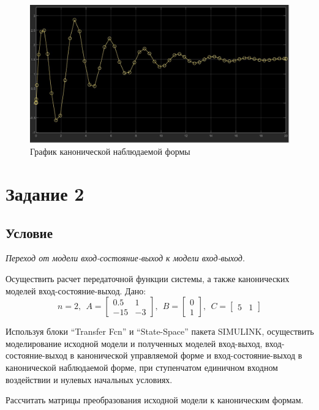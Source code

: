 \documentclass[a4paper, 12pt]{article}
\begin{document}
    \begin{figure}[H]
        \centering
        \includegraphics[scale=0.3]{canonical_observable_form_1.jpg}
        \captionsetup{skip=0pt}
        \caption{График канонической наблюдаемой формы}
        \label{fig:cof1}
    \end{figure}


    \section{Задание 2}
    \subsection{Условие}
    \textit{Переход от модели вход-состояние-выход к модели вход-выход.}
    \begin{compactitem}
    \item Осуществить расчет передаточной функции системы, а также канонических моделей вход-состояние-выход. Дано:
    $$n=2,\ \ A=
    \begin{bmatrix}
        0.5 & 1\\
        -15 & -3
    \end{bmatrix},\ \
    B=
    \begin{bmatrix}
        0\\
        1
    \end{bmatrix},\ \
    C=
    \begin{bmatrix}
        5 & 1
    \end{bmatrix}$$
    \item Используя блоки ``Transfer Fcn'' и ``State-Space'' пакета SIMULINK,
    осуществить моделирование исходной модели и полученных моделей вход-выход,
    вход-состояние-выход в канонической управляемой форме и вход-состояние-выход
    в канонической наблюдаемой форме, при ступенчатом единичном входном воздействии
    и нулевых начальных условиях.
    \item Рассчитать матрицы преобразования исходной модели к каноническим формам.
    \end{compactitem}
\end{document}
